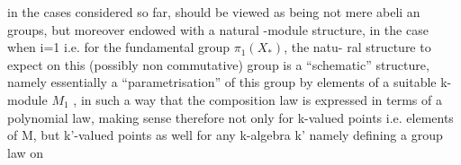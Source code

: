 in the cases considered so far, should be viewed as being not mere abeli
\hand{-}an groups, but moreover endowed with a natural -module structure,
in the case when i=1 i.e. for the fundamental group $\pi_1(X_*)$, the natu-%
ral structure to expect on this (possibly non commutative) group is a
 ``schematic'' structure, namely essentially a  ``parametrisation'' of this
group by elements of a suitable k-module $M_1$ , in such a way that the
composition law is expressed in terms of a polynomial law, making sense
therefore not only for k-valued points i.e.  elements of M, but  k'-valued
points as well \hand{(}for any k-algebra k'\hand{),} namely defining a group law on

